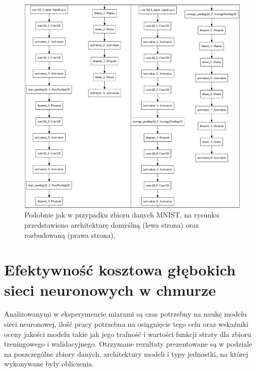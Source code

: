 \documentclass[12pt,a4paper,twoside]{article}
\begin{document}
\begin{figure}[h]
  \centering
\includegraphics[scale=0.35]{../obrazy/fig:cifar_cnn.png}
\caption{Podobnie jak w przypadku zbioru danych MNIST, na rysunku przedstawiono architekturę domyślną (lewa strona) oraz rozbudowaną (prawa strona).\label{fig:cifar_cnn}}
\end{figure}

\clearpage

\section{Efektywność kosztowa głębokich sieci neuronowych w chmurze}

\noindent
Analizowanymi w eksperymencie miarami są czas potrzebny na naukę modelu sieci neuronowej, ilość pracy potrzebna na osiągnięcie tego celu oraz wskaźniki oceny jakości modelu takie jak jego trafność i wartości funkcji straty dla zbioru treningowego i walidacyjnego. Otrzymane rezultaty prezentowane są w podziale na poszczególne zbiory danych, architektury modeli i typy jednostki, na której wykonywane były obliczenia.
\end{document}
